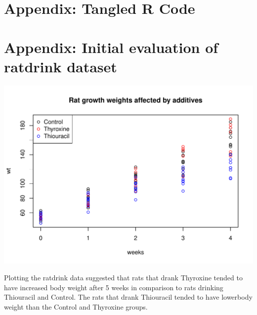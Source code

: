 \documentclass[11pt]{article}
\begin{document}
\section{Appendix: Tangled R Code}
\label{sec-3}


 
\section{Appendix: Initial evaluation of ratdrink dataset}
\label{sec-4}


\includegraphics[width=.9\linewidth]{./ratweights.pdf}

Plotting the ratdrink data suggested that rats that drank Thyroxine
tended to have increased body weight after 5 weeks in comparison to rats
drinking Thiouracil and Control. The rats that drank Thiouracil
tended to have lowerbody weight than the Control and Thyroxine groups.
\end{document}
